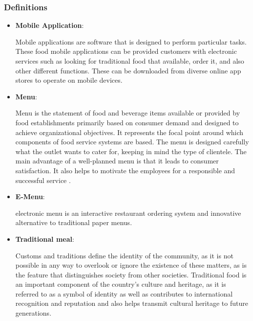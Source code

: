 \subsubsection{Definitions}
\begin{itemize}
	\item \textbf{Mobile Application}:\begin{small} Mobile applications are software that is designed to perform particular tasks. These food mobile applications can be provided customers with electronic services such as looking for traditional food that available, order it, and also other different functions. These can be downloaded from diverse online app stores to operate on mobile devices\cite{4}. \end{small}
	
	
	\item \textbf{Menu}:\begin{small} Menu is the statement of food and beverage items available or provided by food establishments primarily based on consumer demand and designed to achieve organizational objectives. It represents the focal point around which components of food service systems are based. The menu is designed carefully what the outlet wants to cater for, keeping in mind the type of clientele. The main advantage of a well-planned menu is that it leads to consumer satisfaction. It also helps to motivate the employees for a responsible and successful service \cite{5}. \end{small}

	\item \textbf{E-Menu}: \begin{small}electronic menu is an interactive restaurant ordering system and innovative alternative to traditional paper menus\cite{6}. \end{small}
	\item \textbf{Traditional meal}:\begin{small}Customs and traditions define the identity of the community, as it is not possible in any way to overlook or ignore the existence of these matters, as is the feature that distinguishes society from other societies.
Traditional food is an important component of the country's culture and heritage, as it is referred to as a symbol of identity as well as contributes to international recognition and reputation and also helps transmit cultural heritage to future generations\cite{9}\cite{10}. \end{small}
\end{itemize}



